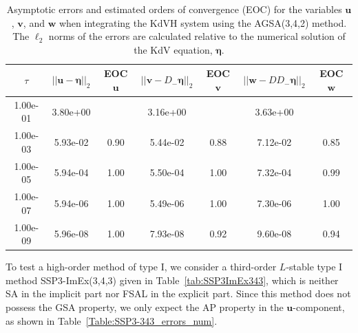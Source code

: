 \documentclass{article}
\newcommand{\ukdv}{\eta}
\begin{document}
\begin{table}[htbp]
    \centering
    \caption{Asymptotic errors and estimated orders of convergence (EOC) for the variables $\pmb{u}$, $\pmb{v}$, and $\pmb{w}$ when integrating
    the KdVH system using the AGSA(3,4,2) method. The $\ell_2$ norms of the errors are calculated relative to the
    numerical solution of the KdV equation, $\pmb{\ukdv}$.}
    \label{Table:AGSA-342_errors_num}
    \begin{tabular}{ccccccc}
      \hline
      \hline
      \multicolumn{1}{c}{$\tau$} &
      \multicolumn{1}{c}{$||\pmb{u}-\pmb{\ukdv}||_2$} &
      \multicolumn{1}{c}{EOC $\pmb{u}$} &
      \multicolumn{1}{c}{$||\pmb{v}-D_- \pmb{\ukdv}||_2$} &
      \multicolumn{1}{c}{EOC $\pmb{v}$} &
      \multicolumn{1}{c}{$||\pmb{w}-D D_- \pmb{\ukdv}||_2$} &
      \multicolumn{1}{c}{EOC $\pmb{w}$} \\\hline
      1.00e-01 & 3.80e+00 &  & 3.16e+00 &  & 3.63e+00 &  \\
      1.00e-03 & 5.93e-02 & 0.90 & 5.44e-02 & 0.88 & 7.12e-02 & 0.85 \\
      1.00e-05 & 5.94e-04 & 1.00 & 5.50e-04 & 1.00 & 7.32e-04 & 0.99 \\
      1.00e-07 & 5.94e-06 & 1.00 & 5.49e-06 & 1.00 & 7.30e-06 & 1.00 \\
      1.00e-09 & 5.96e-08 & 1.00 & 7.93e-08 & 0.92 & 9.60e-08 & 0.94 \\
    \end{tabular}
\end{table}

To test a high-order method of type I, we consider a third-order $L$-stable type I method SSP3-ImEx(3,4,3) given in
Table~\ref{tab:SSP3ImEx343}, which is neither SA in the implicit part nor FSAL in the explicit part.
Since this method does not possess the GSA property, we only expect the AP property in the $\pmb{u}$-component, as shown in
Table~\ref{Table:SSP3-343_errors_num}.
\end{document}
